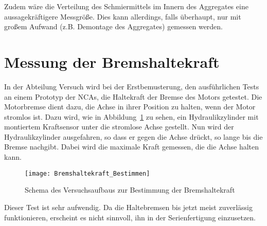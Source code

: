 Zudem wäre die Verteilung des Schmiermittels im Innern des Aggregates eine aussagekräftigere Messgröße.  Dies kann allerdings, falls überhaupt, nur mit großem Aufwand (z.B. Demontage des Aggregates) gemessen werden.




\section{Messung der Bremshaltekraft}\label{cha_Messung_der_Bremshaltekraft}



In der Abteilung Versuch wird bei der Erstbemusterung, den ausführlichen Tests an einem Prototyp der NCAs, die Haltekraft der Bremse des Motors getestet. Die Motorbremse dient dazu, die Achse in ihrer Position zu halten, wenn der Motor stromlos ist. Dazu wird, wie in Abbildung~\ref{fig:Darstellung_Bremshaltekraft_bestimmen} zu sehen, ein Hydraulikzylinder mit montiertem Kraftsensor unter die stromlose Achse gestellt. Nun wird der Hydraulikzylinder ausgefahren, so dass er gegen die Achse drückt, so lange bis die Bremse nachgibt. Dabei wird die maximale Kraft gemessen, die die Achse halten kann. 

\begin{figure}[H]
\centering
\texttt{[image: Bremshaltekraft\_Bestimmen]} 
\caption{Schema des Versuchsaufbaus zur Bestimmung der Bremshaltekraft} 
\label{fig:Darstellung_Bremshaltekraft_bestimmen}
\end{figure}


Dieser Test ist sehr aufwendig. Da die Haltebremsen bis jetzt meist zuverlässig funktionieren, erscheint es nicht sinnvoll, ihn in der Serienfertigung einzusetzen.
















